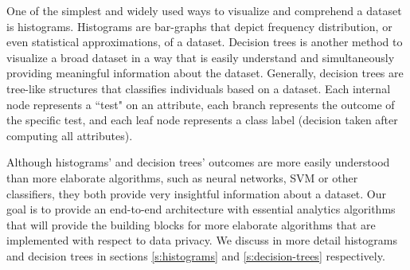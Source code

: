 One of the simplest and widely used ways to visualize and comprehend a dataset is histograms.
Histograms are bar-graphs that depict frequency distribution, or even statistical approximations, of a dataset.
Decision trees is another method to visualize a broad dataset in a way that is easily understand and simultaneously providing meaningful information about the dataset.
Generally, decision trees are tree-like structures that classifies individuals based on a dataset.
Each internal node represents a ``test" on an attribute, each branch represents the outcome of the specific test, and each leaf node represents a class label (decision taken after computing all attributes).

Although histograms' and decision trees' outcomes are more easily understood than more elaborate algorithms, such as neural networks, SVM or other classifiers, they both provide very insightful information about a dataset.
Our goal is to provide an end-to-end architecture with essential analytics algorithms that will provide the building blocks for more elaborate algorithms that are implemented with respect to data privacy.
We discuss in more detail histograms and decision trees in sections \ref{s:histograms} and \ref{s:decision-trees} respectively.


